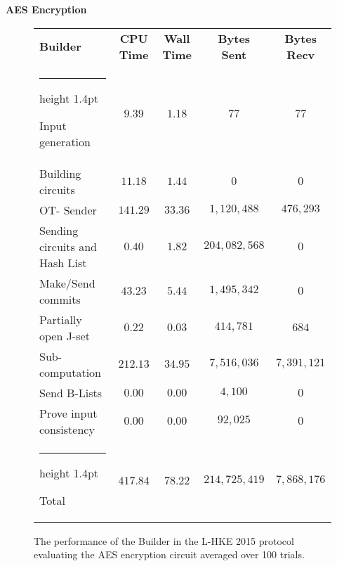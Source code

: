 \documentclass[11pt]{article} %
\makeatletter
\newcommand{\thickhline}{%
    \noalign {\ifnum 0=`}\fi \hrule height 1.4pt
    \futurelet \reserved@a \@xhline
}
\makeatother
\begin{document}
				\FloatBarrier
				\noindent \textbf{AES Encryption}
				\begin{figure}[!ht]
					\begin{tabular}{| p{4.3cm} | c c c c |}
						\hline
						\textbf{Builder} & \textbf{CPU Time} & \textbf{Wall Time} & \textbf{Bytes Sent} & \textbf{Bytes Recv} \\
						\thickhline
						Input generation & $9.39$ & $1.18$ & $77$ & $77$ \\
						\hline
						Building circuits & $11.18$ & $1.44$ & $0$ & $0$ \\
						\hline
						OT- Sender & $141.29$ & $33.36$ & $1,120,488$ & $476,293$ \\
						\hline
						Sending circuits and Hash List & $0.40$ & $1.82$ & $204,082,568$ & $0$ \\
						\hline
						Make/Send commits & $43.23$ & $5.44$ & $1,495,342$ & $0$ \\
						\hline
						Partially open J-set & $0.22$ & $0.03$ & $414,781$ & $684$ \\
						\hline
						Sub-computation & $212.13$ & $34.95$ & $7,516,036$ & $7,391,121$ \\
						\hline
						Send B-Lists & $0.00$ & $0.00$ & $4,100$ & $0$ \\
						\hline
						Prove input consistency & $0.00$ & $0.00$ & $92,025$ & $0$ \\
						\thickhline
						Total & $417.84$ & $78.22$ & $214,725,419$ & $7,868,176$ \\
						\hline
					\end{tabular}
					\caption{The performance of the Builder in the L-HKE 2015 protocol evaluating the AES encryption circuit averaged over 100 trials. \label{table:L-HKE_2015_AES_Builder}}
				\end{figure}
\end{document}
